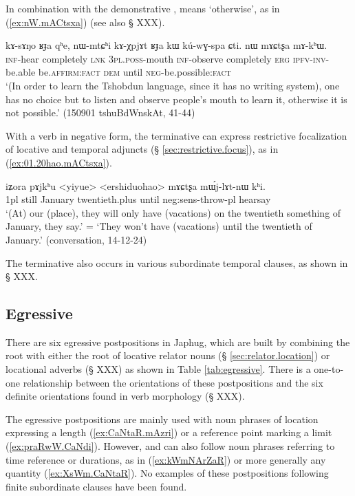 In combination with the demonstrative ,  means `otherwise', as in (\ref{ex:nW.mACtsxa}) (see also § XXX).

\begin{exe}
\ex \label{ex:nW.mACtsxa}
 \gll   kɤ-sɤŋo ʁɟa qʰe,  nɯ-mtɕʰi kɤ-χpjɤt ʁɟa kɯ kú-wɣ-spa ɕti.  nɯ mɤɕtʂa mɤ-kʰɯ. \\
 \textsc{inf}-hear completely \textsc{lnk} \textsc{3pl}.\textsc{poss}-mouth \textsc{inf}-observe completely \textsc{erg} \textsc{ipfv}-\textsc{inv}-be.able be.\textsc{affirm}:\textsc{fact} \textsc{dem} until \textsc{neg}-be.possible:\textsc{fact} \\
\glt `(In order to learn the Tshobdun language, since it has no writing system), one has no choice but to listen and observe people's mouth to learn it, otherwise it is not possible.' (150901 tshuBdWnskAt, 41-44)
\end{exe}

With a verb in negative form, the terminative can express restrictive focalization of locative and temporal adjuncts (§ \ref{sec:restrictive.focus}), as in (\ref{ex:01.20hao.mACtsxa}).

\begin{exe}
\ex \label{ex:01.20hao.mACtsxa}
 \gll  iʑora pɤjkʰu <yiyue> <ershiduohao> mɤɕtʂa mɯ́j-lɤt-nɯ kʰi. \\
 1pl still January twentieth.plus until neg:sens-throw-pl hearsay \\
 \glt `(At) our (place), they will only have (vacations) on the twentieth something of January, they say.' = `They won't have (vacations) until the twentieth of January.' (conversation, 14-12-24)
 \end{exe}
 
The terminative also occurs in various subordinate temporal clauses, as shown in § XXX.

\subsection{Egressive} \label{sec:egressive}  
There are six egressive postpositions in Japhug, which are built by combining the root  with either the root of locative relator nouns (§ \ref{sec:relator.location}) or locational adverbs (§ XXX) as shown in Table \ref{tab:egressive}. There is a one-to-one relationship between the orientations of these postpositions and the six definite orientations found in verb morphology (§ XXX).

The egressive postpositions are mainly used with noun phrases of location expressing a length (\ref{ex:CaNtaR.mAzri}) or a reference point marking a limit (\ref{ex:praRwW.CaNdi}). However,  and  can also follow noun phrases referring to time reference or durations, as in (\ref{ex:kWmNArZaR}) or more generally any quantity (\ref{ex:XsWm.CaNtaR}). No examples of these postpositions following finite subordinate clauses have been found.


